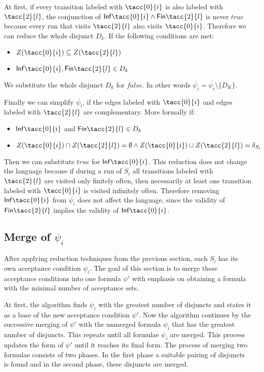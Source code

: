 \documentclass[runningheads]{llncs}
\def\Inf{\ensuremath{\mathsf{Inf}}}
\def\Fin{\ensuremath{\mathsf{Fin}}}
\def\false{\mathit{false}}
\def\true{\mathit{true}}
\begin{document}
At first, if every transition labeled with  $\tacc{0}{i}$ is also labeled with $\tacc{2}{l}$, the conjunction of $\Inf\tacc{0}{i} \land \Fin\tacc{2}{l}$ is never $\true$ because every run that visits $\tacc{2}{l}$ also visits $\tacc{0}{i}$. Therefore we can reduce the whole disjunct $D_{k}$.
If the following conditions are met:
\begin{itemize}
    \item $Z(\tacc{0}{i}) \subseteq Z(\tacc{2}{l})$
    \item $\Inf\tacc{0}{i}, \Fin\tacc{2}{l} \in D_{k}$
\end{itemize}
We substitute the whole disjunct $D_{k}$ for $\false$. In other words $\overline{\psi_{i}} = \overline{\psi_{i}} \setminus \{D_{K}\}$.

Finally we can simplify $\overline{\psi_{i}}$, if the edges labeled with $\tacc{0}{i}$ and edges labeled with $\tacc{2}{l}$ are complementary.
More formally if:
\begin{itemize}
    \item  $\Inf\tacc{0}{i}$ and $\Fin\tacc{2}{l} \in D_{k}$
    \item $Z(\tacc{0}{i}) \cap Z(\tacc{2}{l}) = \emptyset \land Z(\tacc{0}{i}) \cup Z(\tacc{2}{l}) = \delta_{S_{i}} $
\end{itemize}
Then we can substitute $\true$ for $\Inf\tacc{0}{i}$.
This reduction does not change the language because if during a run of $S_{i}$ all transitions labeled with $\tacc{2}{l}$ are visited only finitely often, then necessarily at least one transition labeled with $\tacc{0}{i}$ is visited infinitely often. Therefore removing $\Inf\tacc{0}{i}$ from $\overline{\psi_{i}}$ does not affect the language, since the validity of $\Fin\tacc{2}{l}$ implies the validity of $\Inf\tacc{0}{i}$.

\subsection{Merge of $\psi_{i}$}
After applying reduction techniques from the previous section, each $S_{i}$ has its own acceptance condition $\psi_{i}$. The goal of this section is to merge these acceptance conditions into one formula $\psi'$ with emphasis on obtaining a formula with the minimal number of acceptance sets.

At first, the algorithm finds $\psi_{i}$ with the greatest number of disjuncts and states it as a base of the new acceptance condition $\psi'$. Now the algorithm continues by the successive merging of $\psi'$ with the unmerged formula $\psi_{i}$ that has the greatest number of disjuncts. This repeats until all formulae $\psi_{i}$ are merged. This process updates the form of $\psi'$ until it reaches its final form. The process of merging two formulae consists of two phases. In the first phase a suitable pairing of disjuncts is found and in the second phase, these disjuncts are merged.
\end{document}
